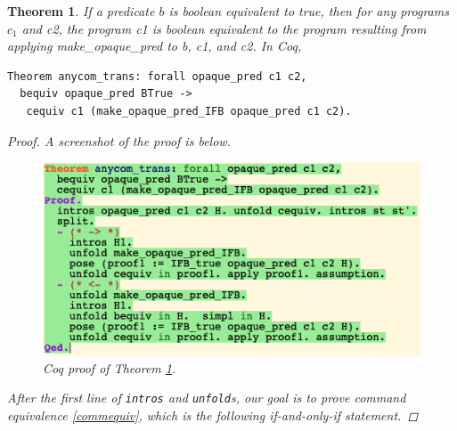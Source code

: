 \documentclass[12pt,notitlepage]{report}
\theoremstyle{plain}
\newtheorem{theo}{Theorem}[section]
\theoremstyle{definition}
\numberwithin{equation}{section}
\begin{document}
\begin{theo}\label{generalcequiv}
If a predicate $b$ is boolean equivalent to true, then for any programs $c_1$ and c2,
the program c1 is boolean equivalent to the program resulting from applying make\_opaque\_pred
to b, c1, and c2.  In Coq,
\begin{verbatim}
Theorem anycom_trans: forall opaque_pred c1 c2,
  bequiv opaque_pred BTrue -> 
   cequiv c1 (make_opaque_pred_IFB opaque_pred c1 c2).
\end{verbatim}
\begin{proof}
A screenshot of the proof is below.

\noindent        \begin{figure}[H]
        \centering
        \includegraphics[scale=0.6]{anycom_trans}
        \caption{Coq proof of Theorem \ref{generalcequiv}.}
        \label{fig:generalcequiv}
        \end{figure}

    After the first line of \verb$intros$ and \verb$unfold$s, our goal is to prove command equivalence \eqref{commequiv}, which is the following if-and-only-if statement.
    

\end{proof}
\end{theo}
\end{document}
